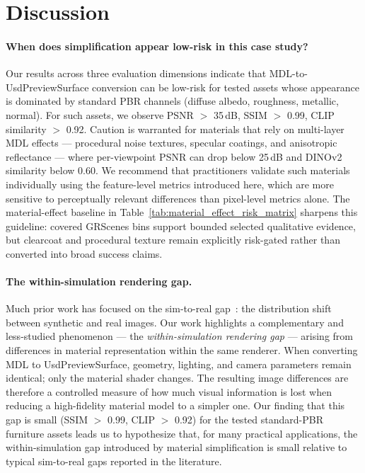 \section{Discussion}
\label{sec:discussion}

\paragraph{When does simplification appear low-risk in this case study?}
Our results across three evaluation dimensions indicate that
MDL-to-UsdPreviewSurface conversion can be low-risk for tested assets whose
appearance is dominated by standard PBR channels (diffuse albedo, roughness,
metallic, normal). For such assets, we observe PSNR $>$ 35\,dB, SSIM $>$ 0.99, CLIP
similarity $>$ 0.92. Caution is
warranted for materials that rely on multi-layer MDL effects --- procedural
noise textures, specular coatings, and anisotropic reflectance --- where
per-viewpoint PSNR can drop below 25\,dB and DINOv2 similarity below 0.60. We
recommend that practitioners validate such materials individually using the
feature-level metrics introduced here, which are more sensitive to perceptually
relevant differences than pixel-level metrics alone. The material-effect
baseline in Table~\ref{tab:material_effect_risk_matrix} sharpens this guideline:
covered GRScenes bins support bounded selected qualitative evidence, but
clearcoat and procedural texture remain explicitly risk-gated rather than
converted into broad success claims.

\paragraph{The within-simulation rendering gap.}
Much prior work has focused on the sim-to-real
gap~\cite{Tobin2017Domain,Tremblay2018Training,Zhao2020Sim,Garcia2023Robust}:
the distribution shift between synthetic and real images. Our work highlights a
complementary and less-studied phenomenon --- the \emph{within-simulation
rendering gap} --- arising from differences in material representation within
the same renderer. When converting MDL to UsdPreviewSurface, geometry, lighting,
and camera parameters remain identical; only the material shader changes. The
resulting image differences are therefore a controlled measure of how much visual
information is lost when reducing a high-fidelity material model to a simpler
one. Our finding that this gap is small (SSIM $>$ 0.99, CLIP $>$ 0.92) for the
tested standard-PBR furniture assets leads us to hypothesize that, for many practical
applications, the within-simulation gap introduced by material simplification
is small relative to typical sim-to-real gaps reported in the literature.

